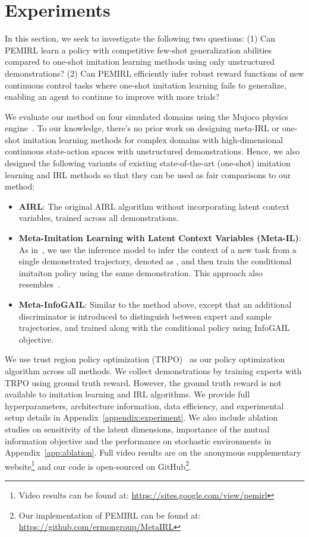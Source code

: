 \section{Experiments}
\label{sec:experiments}

In this section, we seek to investigate the following two questions: (1) Can PEMIRL learn a policy with competitive few-shot generalization abilities compared to one-shot imitation learning methods using only unstructured demonstrations? (2) Can PEMIRL efficiently infer robust reward functions of new continuous control tasks where one-shot imitation learning fails to generalize, enabling an agent to continue to improve with more trials?

We evaluate our method on four simulated domains using the Mujoco physics engine~\cite{mujoco}. To our knowledge, there's no prior work on designing meta-IRL or one-shot imitation learning methods for complex domains with high-dimensional continuous state-action spaces with unstructured demonstrations. Hence, we also designed the following variants of existing state-of-the-art (one-shot) imitation learning and IRL methods so that they can be used as fair comparisons to our method:
\begin{itemize}[leftmargin=.3in]
\item \textbf{AIRL}: The original AIRL algorithm without incorporating latent context variables, trained across all demonstrations.
\item \textbf{Meta-Imitation Learning with Latent Context Variables (Meta-IL)}: As in~\citep{pearl}, we use the inference model  to infer the context of a new task from a single demonstrated trajectory, denoted as , and then train the conditional imitaiton policy  using the same demonstration. This approach also resembles~\cite{duan2017}.
\item \textbf{Meta-InfoGAIL}: Similar to the method above, except that an additional discriminator  is introduced to distinguish between expert and sample trajectories, and trained along with the conditional policy using InfoGAIL~\cite{li2017infogail} objective.
\end{itemize}
We use trust region policy optimization (TRPO)~\cite{trpo} as our policy optimization algorithm across all methods. We collect demonstrations by training experts with TRPO using ground truth reward. However, the ground truth reward is not available to imitation learning and IRL algorithms. We provide full hyperparameters, architecture information, data efficiency, and experimental setup details in Appendix~\ref{appendix:experiment}. We also include ablation studies on sensitivity of the latent dimensions, importance of the mutual information objective and the performance on stochastic environments in Appendix~\ref{app:ablation}. Full video results are on the anonymous supplementary website\footnote{Video results can be found at: \url{https://sites.google.com/view/pemirl}} and our code is open-sourced on GitHub\footnote{Our implementation of PEMIRL can be found at: \url{https://github.com/ermongroup/MetaIRL}}.

